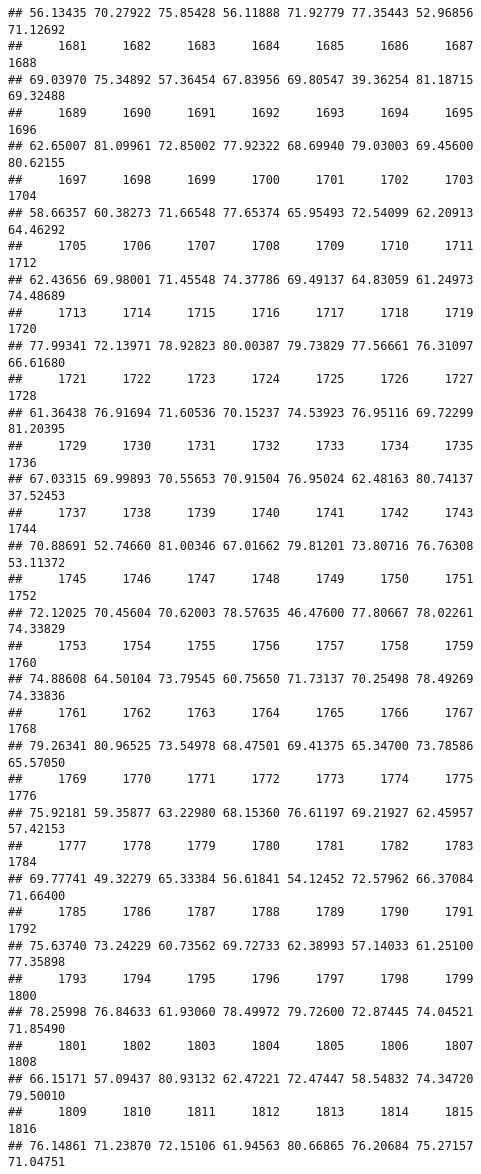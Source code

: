 \documentclass[
]{article}
\begin{document}
\begin{verbatim}
## 56.13435 70.27922 75.85428 56.11888 71.92779 77.35443 52.96856 71.12692 
##     1681     1682     1683     1684     1685     1686     1687     1688 
## 69.03970 75.34892 57.36454 67.83956 69.80547 39.36254 81.18715 69.32488 
##     1689     1690     1691     1692     1693     1694     1695     1696 
## 62.65007 81.09961 72.85002 77.92322 68.69940 79.03003 69.45600 80.62155 
##     1697     1698     1699     1700     1701     1702     1703     1704 
## 58.66357 60.38273 71.66548 77.65374 65.95493 72.54099 62.20913 64.46292 
##     1705     1706     1707     1708     1709     1710     1711     1712 
## 62.43656 69.98001 71.45548 74.37786 69.49137 64.83059 61.24973 74.48689 
##     1713     1714     1715     1716     1717     1718     1719     1720 
## 77.99341 72.13971 78.92823 80.00387 79.73829 77.56661 76.31097 66.61680 
##     1721     1722     1723     1724     1725     1726     1727     1728 
## 61.36438 76.91694 71.60536 70.15237 74.53923 76.95116 69.72299 81.20395 
##     1729     1730     1731     1732     1733     1734     1735     1736 
## 67.03315 69.99893 70.55653 70.91504 76.95024 62.48163 80.74137 37.52453 
##     1737     1738     1739     1740     1741     1742     1743     1744 
## 70.88691 52.74660 81.00346 67.01662 79.81201 73.80716 76.76308 53.11372 
##     1745     1746     1747     1748     1749     1750     1751     1752 
## 72.12025 70.45604 70.62003 78.57635 46.47600 77.80667 78.02261 74.33829 
##     1753     1754     1755     1756     1757     1758     1759     1760 
## 74.88608 64.50104 73.79545 60.75650 71.73137 70.25498 78.49269 74.33836 
##     1761     1762     1763     1764     1765     1766     1767     1768 
## 79.26341 80.96525 73.54978 68.47501 69.41375 65.34700 73.78586 65.57050 
##     1769     1770     1771     1772     1773     1774     1775     1776 
## 75.92181 59.35877 63.22980 68.15360 76.61197 69.21927 62.45957 57.42153 
##     1777     1778     1779     1780     1781     1782     1783     1784 
## 69.77741 49.32279 65.33384 56.61841 54.12452 72.57962 66.37084 71.66400 
##     1785     1786     1787     1788     1789     1790     1791     1792 
## 75.63740 73.24229 60.73562 69.72733 62.38993 57.14033 61.25100 77.35898 
##     1793     1794     1795     1796     1797     1798     1799     1800 
## 78.25998 76.84633 61.93060 78.49972 79.72600 72.87445 74.04521 71.85490 
##     1801     1802     1803     1804     1805     1806     1807     1808 
## 66.15171 57.09437 80.93132 62.47221 72.47447 58.54832 74.34720 79.50010 
##     1809     1810     1811     1812     1813     1814     1815     1816 
## 76.14861 71.23870 72.15106 61.94563 80.66865 76.20684 75.27157 71.04751 

\end{verbatim}
\end{document}
